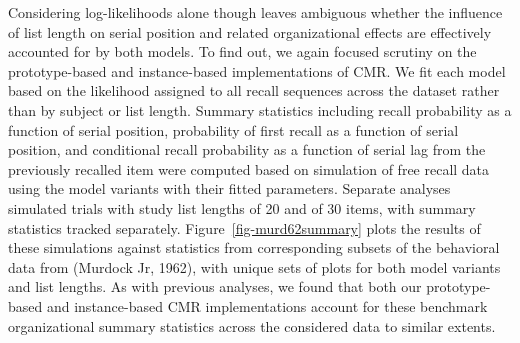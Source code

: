 \documentclass[
  letterpaper,
  DIV=11]{article}
\begin{document}
Considering log-likelihoods alone though leaves ambiguous whether the
influence of list length on serial position and related organizational
effects are effectively accounted for by both models. To find out, we
again focused scrutiny on the prototype-based and instance-based
implementations of CMR. We fit each model based on the likelihood
assigned to all recall sequences across the dataset rather than by
subject or list length. Summary statistics including recall probability
as a function of serial position, probability of first recall as a
function of serial position, and conditional recall probability as a
function of serial lag from the previously recalled item were computed
based on simulation of free recall data using the model variants with
their fitted parameters. Separate analyses simulated trials with study
list lengths of 20 and of 30 items, with summary statistics tracked
separately. Figure~\ref{fig-murd62summary} plots the results of these
simulations against statistics from corresponding subsets of the
behavioral data from (Murdock Jr, 1962), with unique sets of plots for
both model variants and list lengths. As with previous analyses, we
found that both our prototype-based and instance-based CMR
implementations account for these benchmark organizational summary
statistics across the considered data to similar extents.
\end{document}
